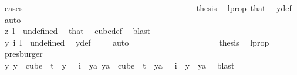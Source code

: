 \begin{isabellebody}
\ cases\isanewline
\ \ \ \ \ \ \ \ \ \ \ \ \ \ \ \ \ \ \isamarkupfalse%
\ {}\isanewline
\ \ \ \ \ \ \ \ \ \ \ \ \ \ \ \ \ \ \isamarkupfalse%
\ \isamarkupfalse%
\ {\isacharquery}{\kern0pt}thesis\ \isamarkupfalse%
\ l{\isacharunderscore}{\kern0pt}prop\ that{\isacharparenleft}{\kern0pt}{}{\isacharparenright}{\kern0pt}\ \isamarkupfalse%
\ y{\isacharunderscore}{\kern0pt}def\ \isamarkupfalse%
\ auto\isanewline
\ \ \ \ \ \ \ \ \ \ \ \ \ \ \ \ \isamarkupfalse%
\isanewline
\ \ \ \ \ \ \ \ \ \ \ \ \ \ \ \ \ \ \isamarkupfalse%
\ {}\isanewline
\ \ \ \ \ \ \ \ \ \ \ \ \ \ \ \ \ \ \isamarkupfalse%
\ \isamarkupfalse%
\ {\isachardoublequoteopen}z\ l\ {\isacharequal}{\kern0pt}\ undefined{\isachardoublequoteclose}\ \isamarkupfalse%
\ that\ \isamarkupfalse%
\ cube{\isacharunderscore}{\kern0pt}def\ \isamarkupfalse%
\ blast\isanewline
\ \ \ \ \ \ \ \ \ \ \ \ \ \ \ \ \ \ \isamarkupfalse%
\ \isamarkupfalse%
\ {\isachardoublequoteopen}y\ i\ l\ {\isacharequal}{\kern0pt}\ undefined{\isachardoublequoteclose}\ \isamarkupfalse%
\ y{\isacharunderscore}{\kern0pt}def\ \isamarkupfalse%
\ {}\ \isamarkupfalse%
\ auto\isanewline
\ \ \ \ \ \ \ \ \ \ \ \ \ \ \ \ \ \ \isamarkupfalse%
\ \isamarkupfalse%
\ {\isacharquery}{\kern0pt}thesis\ \isamarkupfalse%
\ l{\isacharunderscore}{\kern0pt}prop\ \isamarkupfalse%
\ presburger\isanewline
\ \ \ \ \ \ \ \ \ \ \ \ \ \ \ \ \isamarkupfalse%
\isanewline
\ \ \ \ \ \ \ \ \ \ \ \ \ \ \isamarkupfalse%
\isanewline
\ \ \ \ \ \ \ \ \ \ \ \ \ \ \isamarkupfalse%
\ \isamarkupfalse%
\ {\isachardoublequoteopen}{\isasymexists}y{\isachardot}{\kern0pt}\ {\isacharparenleft}{\kern0pt}y\ {\isasymin}\ cube\ {}\ t\ {\isasymand}\ y\ {}\ {\isacharequal}{\kern0pt}\ i{\isacharparenright}{\kern0pt}\ {\isasymand}\ {\isacharparenleft}{\kern0pt}{\isasymforall}ya{\isachardot}{\kern0pt}\ ya\ {\isasymin}\ cube\ {}\ t\ {\isasymand}\ ya\ {}\ {\isacharequal}{\kern0pt}\ i\ {\isasymlongrightarrow}\ y\ {\isacharequal}{\kern0pt}\ ya{\isacharparenright}{\kern0pt}{\isachardoublequoteclose}\ \isamarkupfalse%
\ blast\isanewline

\end{isabellebody}
